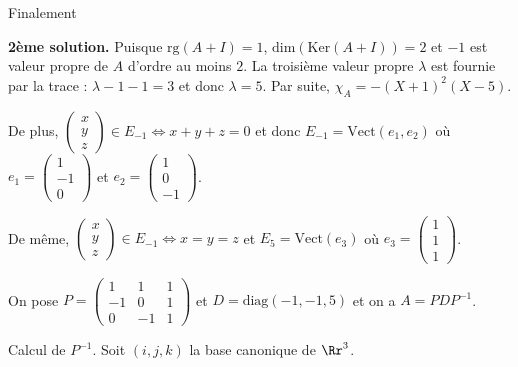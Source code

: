 {{Finalement

\begin{center}
\end{center}

\textbf{2ème solution.} Puisque $\text{rg}(A+I)=1$, $\text{dim}(\text{Ker}(A+I))=2$ et $-1$ est valeur propre de $A$ d'ordre au moins $2$. La troisième valeur propre $\lambda$ est fournie par la trace : $\lambda-1-1=3$ et donc $\lambda=5$. Par suite, $\chi_A=-(X+1)^2(X-5)$.

De plus, $\left(\begin{array}{c}
x\\
y\\
z
\end{array}
\right)\in E_{-1}\Leftrightarrow x+y+z=0$ et donc $E_{-1}=\text{Vect}(e_1,e_2)$ où $e_1=\left(\begin{array}{c}
1\\
-1\\
0
\end{array}
\right)$ et $e_2=\left(\begin{array}{c}
1\\
0\\
-1
\end{array}
\right)$.

De même,  $\left(\begin{array}{c}
x\\
y\\
z
\end{array}
\right)\in E_{-1}\Leftrightarrow x=y=z$ et $E_5=\text{Vect}(e_3)$ où $e_3=\left(\begin{array}{c}
1\\
1\\
1
\end{array}
\right)$.

On pose $P=\left(
\begin{array}{ccc}
1&1&1\\
-1&0&1\\
0&-1&1
\end{array}
\right)$ et $D=\text{diag}(-1,-1,5)$ et on a $A =PDP^{-1}$.

Calcul de $P^{-1}$. Soit $(i,j,k)$ la base canonique de $\Rr^3$.

}}
